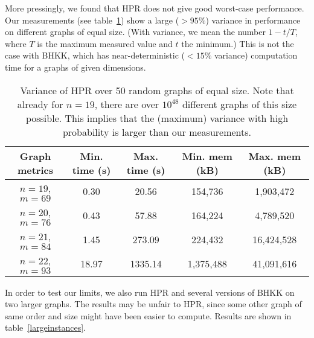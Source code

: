 \documentclass{cslthse-msc}
\begin{document}
More pressingly, we found that HPR does not give good worst-case performance. Our measurements (see table~\ref{variance}) show a large ($> 95\%$) variance in performance on different graphs of equal size. (With variance, we mean the number $1 - t/T$, where $T$ is the maximum measured value and $t$ the minimum.) This is not the case with BHKK, which has near-deterministic ($< 15\%$ variance) computation time for a graphs of given dimensions.
\begin{table}[H]\centering
\begin{tabular}{c|cccc} \hline
  Graph metrics		& Min. time (s)	& Max. time (s)	& Min. mem (kB)	& Max. mem (kB) \\ \hline
  $n = 19$, $m = 69$ 	& 0.30 		& 20.56		& 154,736	& 1,903,472\\ \hline
  $n = 20$, $m = 76$ 	& 0.43 		& 57.88		& 164,224	& 4,789,520 \\ \hline
  $n = 21$, $m = 84$ 	& 1.45 		& 273.09	& 224,432	& 16,424,528 \\ \hline
  $n = 22$, $m = 93$ 	& 18.97		& 1335.14	& 1,375,488	& 41,091,616 \\ \hline
\end{tabular}
\caption{Variance of HPR over 50 random graphs of equal size. Note that already for $n = 19$, there are over $10^{48}$ different graphs of this size possible. This implies that the (maximum) variance with high probability is larger than our measurements.}
\label{variance}
\end{table}
In order to test our limits, we also run HPR and several versions of BHKK on two larger graphs. The results may be unfair to HPR, since some other graph of same order and size might have been easier to compute. Results are shown in table~\ref{largeinstances}.
\end{document}
